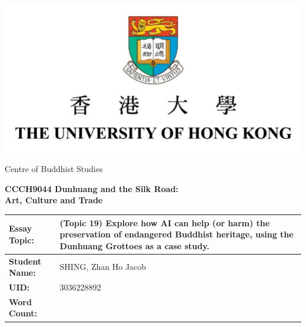 \begin{center}
    \includegraphics{figs/misc/essay-cover-hku-logo.png}

    {\Large Centre of Buddhist Studies}

    \vspace*{3cm}

    {\LARGE \textbf{CCCH9044 Dunhuang and the Silk Road: \\
    Art, Culture and Trade}}

    \vspace*{2cm}

    {\large
    \begin{tabularx}{\textwidth}{|l|X|}
        \hline
        \textbf{Essay Topic:} & (Topic 19) Explore how AI can help (or harm) the preservation of
        endangered Buddhist heritage,
        using the Dunhuang Grottoes as a case study. \\
        \hline
        \textbf{Student Name:} & SHING, Zhan Ho Jacob \\
        \hline
        \textbf{UID:} & 3036228892 \\
        \hline
        \textbf{Word Count:} & \\
        \hline
    \end{tabularx}}
\end{center}